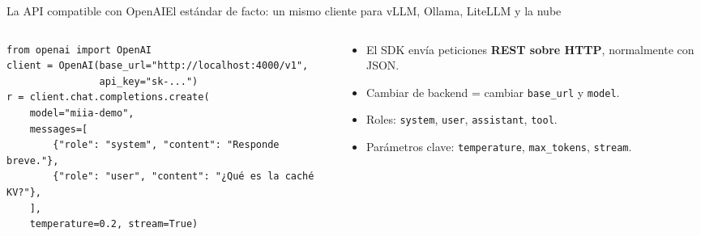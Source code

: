 
\begin{frame}[fragile]{La API compatible con OpenAI}{El estándar de facto: un mismo cliente para vLLM, Ollama, LiteLLM y la nube}
	\begin{columns}[T]
		\begin{column}{0.58\textwidth}
			\begin{lstlisting}
from openai import OpenAI
client = OpenAI(base_url="http://localhost:4000/v1",
                api_key="sk-...")
r = client.chat.completions.create(
    model="miia-demo",
    messages=[
        {"role": "system", "content": "Responde breve."},
        {"role": "user", "content": "¿Qué es la caché KV?"},
    ],
    temperature=0.2, stream=True)
\end{lstlisting}
		\end{column}
		\begin{column}{0.38\textwidth}
			\footnotesize
			\begin{itemize}
				\item El SDK envía peticiones \textbf{REST sobre HTTP}, normalmente con JSON.
				\item Cambiar de backend = cambiar \texttt{base\_url} y \texttt{model}.
				\item Roles: \texttt{system}, \texttt{user}, \texttt{assistant}, \texttt{tool}.
				\item Parámetros clave: \texttt{temperature}, \texttt{max\_tokens}, \texttt{stream}.
			\end{itemize}
		\end{column}
	\end{columns}
\end{frame}

